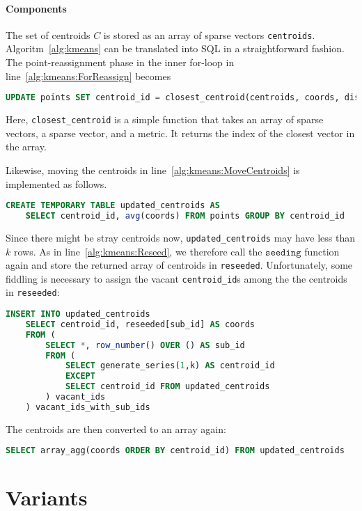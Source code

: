 \paragraph{Components}

The set of centroids $C$ is stored as an array of sparse vectors \texttt{centroids}. Algoritm~\ref{alg:kmeans} can be translated into SQL in a straightforward fashion. The point-reassignment phase in the inner for-loop in line~\ref{alg:kmeans:ForReassign} becomes
\begin{lstlisting}[language=SQL]
	UPDATE points SET centroid_id = closest_centroid(centroids, coords, dist)
\end{lstlisting}
Here, \texttt{closest\_centroid} is a simple function that takes an array of sparse vectors, a sparse vector, and a metric. It returns the index of the closest vector in the array. 

Likewise, moving the centroids in line~\ref{alg:kmeans:MoveCentroids} is implemented as follows.
\begin{lstlisting}[language=SQL]
	CREATE TEMPORARY TABLE updated_centroids AS
	SELECT centroid_id, avg(coords) FROM points GROUP BY centroid_id
\end{lstlisting}
Since there might be stray centroids now, \texttt{updated\_centroids} may have less than $k$ rows. As in line~\ref{alg:kmeans:Reseed}, we therefore call the $\texttt{seeding}$ function again and store the returned array of centroids in \texttt{reseeded}. Unfortunately, some fiddling is necessary to assign the vacant \texttt{centroid\_id}s among the the centroids in \texttt{reseeded}:
\begin{lstlisting}[language=SQL]
	INSERT INTO updated_centroids
	SELECT centroid_id, reseeded[sub_id] AS coords
	FROM (
	    SELECT *, row_number() OVER () AS sub_id
	    FROM (
	        SELECT generate_series(1,k) AS centroid_id
	        EXCEPT
	        SELECT centroid_id FROM updated_centroids
	    ) vacant_ids
	) vacant_ids_with_sub_ids
\end{lstlisting}
The centroids are then converted to an array again:
\begin{lstlisting}[language=SQL]
	SELECT array_agg(coords ORDER BY centroid_id) FROM updated_centroids
\end{lstlisting}


\section{Variants}

